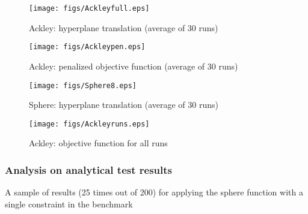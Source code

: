 \documentclass[review]{elsarticle}
\begin{document}
 \begin{figure*}[t!]
        \centering          \texttt{[image: figs/Ackleyfull.eps]}  
        \caption[]
        {\small  Ackley: hyperplane translation (average of 30 runs)} 
        \label{fig:objwCV}
    \end{figure*}
  \begin{figure*}[t!]
        \centering          \texttt{[image: figs/Ackleypen.eps]} 
        \caption[]
        {\small  Ackley: penalized objective function (average of 30 runs)}
         \label{fig:Ackleypenalize}
    \end{figure*}


 \begin{figure*}[t!]
        \centering          \texttt{[image: figs/Sphere8.eps]}  
        \caption[]
        {\small  Sphere: hyperplane translation (average of 30 runs)} 
        \label{fig:Sphere8}
    \end{figure*}
    
    
      \begin{figure*}[t!]
        \centering          \texttt{[image: figs/Ackleyruns.eps]} 
        \caption[]
        {\small  Ackley: objective function for all runs}
         \label{fig:Ackleyruns}
    \end{figure*}

\subsubsection{Analysis on analytical test results}
A sample of results (25 times out of 200) for applying the sphere function with a single constraint in the benchmark
\end{document}

